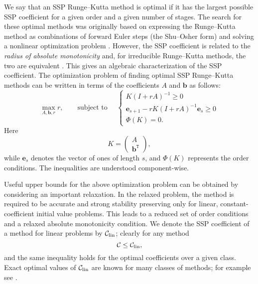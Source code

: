 We say that an SSP Runge--Kutta method is optimal if it has the largest possible SSP coefficient for a given order and a given number of stages.
The search for these optimal methods was originally based on
expressing the Runge--Kutta method as combinations of forward Euler
steps (the Shu--Osher form) and solving a nonlinear optimization
problem \cite{Gottlieb1998, Gottlieb2001, Spiteri2003a, Spiteri2003b,
  Ruuth2004, Ruuth:baron}.
However, the SSP coefficient is related to the \emph{radius of absolute monotonicity} \cite{Kraaijevanger1991} and, for irreducible Runge--Kutta methods, the two are equivalent \cite{Ferracina2004, Higueras2004}.
This gives an algebraic characterization of the SSP coefficient.
The optimization problem of finding optimal SSP Runge--Kutta methods
can be written in terms of the coefficients $A$ and $\bm{b}$ as
follows:
\begin{equation}\label{eq:SSP_opt}
    \max_{A, \bm{b}, r} r, \qquad \text{subject to } \quad \left\{
                                                 \begin{array}{ll}
                                                   K(I + rA)^{-1} \geq 0 \\
                                                   \bm{e}_{s+1} - rK(I + rA)^{-1}\bm{e}_{s} \geq 0 \\
                                                   \Phi(K) = 0.
                                                 \end{array}
                                               \right.
\end{equation}
Here
\begin{equation*}
    K = \left(
            \begin{array}{c}
                     A              \\
                     \bm{b}^{\texttt{T}}
            \end{array}
         \right),
\end{equation*}
while $\bm{e}_s$ denotes the vector of ones of length $s$,
and \( \Phi(K) \) represents the  order conditions.
The inequalities are understood component-wise.

Useful upper bounds for the above optimization problem can be obtained by considering an important relaxation. 
In the relaxed problem, the method is required to be accurate and strong stability preserving only for linear, constant-coefficient initial value problems. 
This leads to a reduced set of order conditions and a relaxed absolute monotonicity condition.
We denote the SSP coefficient of a method for linear problems by $\mathcal{C}_{\text{lin}}$; clearly for any method
\begin{equation*}
	\mathcal{C}\le\mathcal{C}_{\text{lin}},
\end{equation*}
and the same inequality holds for the optimal coefficients over a given class.
Exact optimal values of $\mathcal{C}_{\text{lin}}$ are known for many classes of methods; for
example see \cite{Kraaijevanger1986,ketcheson2009a}.

